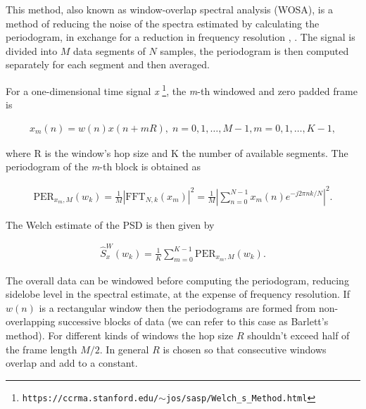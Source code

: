 	This method, also known as window-overlap spectral analysis (WOSA), is a method of reducing the noise of the spectra estimated by calculating the periodogram, in exchange for a reduction in frequency resolution \cite{Welch_period}, \cite{Spagnolini_ch14}.
	The signal is divided into $M$ data segments of $N$ samples, the periodogram is then computed separately for each segment and then averaged.
	
	For a one-dimensional time signal \textit{x} \cite{SASPWEB2011}\footnote{\texttt{https://ccrma.stanford.edu/$\sim$jos/sasp/Welch\_s\_Method.html}}, the \textit{m}-th windowed and zero padded frame is
	
	\begin{align}
		x_m(n) = w(n)x(n + mR), \; n=0,1,\ldots, M-1, m=0,1,\ldots, K-1,
	\end{align}
	
	where R is the window's hop size and K the number of available segments. The periodogram of the \textit{m}-th block is obtained as
	
	\begin{align}
		\text{PER}_{x_m,M}(w_k) = \frac{1}{M} |\text{FFT}_{N,k}(x_m)|^2 = \frac{1}{M}\left|\sum_{n=0}^{N-1}x_m(n)e^{-j2\pi nk/N}\right|^2.
	\end{align}
	
	The Welch estimate of the PSD is then given by
	
	\begin{align}
		\hat{S}^W_x(w_k) = \frac{1}{K}\sum_{m=0}^{K-1}\text{PER}_{x_m,M}(w_k).
	\end{align}
	
	The overall data can be windowed before computing the periodogram, reducing sidelobe level in the spectral estimate, at the expense of frequency resolution. If $w(n)$ is a rectangular window then the periodograms are formed from non-overlapping successive blocks of data (we can refer to this case as Barlett's method). For different kinds of windows the hop size $R$ shouldn't exceed half of the frame length $M/2$. In general $R$ is chosen so that consecutive windows overlap and add to a constant.
	
	
	

	

    
    
    